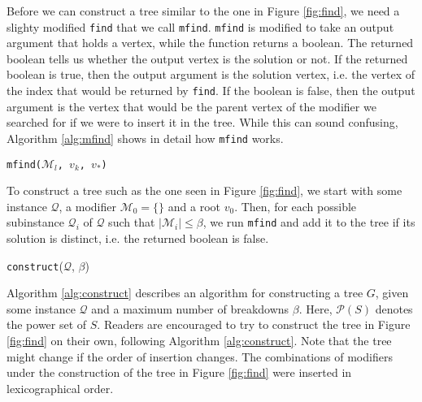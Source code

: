 Before we can construct a tree similar to the one in Figure \ref{fig:find},
we need a slighty modified \texttt{find} that we call \texttt{mfind}.
\texttt{mfind} is modified to take an output argument that holds a vertex,
while the function returns a boolean.
The returned boolean tells us whether the output vertex is the solution or not.
If the returned boolean is true, then the output argument is the solution
vertex, i.e. the vertex of the index that would be returned by \texttt{find}.
If the boolean is false, then the output argument is the vertex that would be
the parent vertex of the modifier we searched for if we were to insert it in
the tree.
While this can sound confusing, Algorithm \ref{alg:mfind} shows in detail how
\texttt{mfind} works.

\begin{algorithm}[ht!]
\caption{\texttt{mfind($\mathcal{M}_l$, $v_k$, $v_*$)}}
\label{alg:mfind}

\end{algorithm}
To construct a tree such as the one seen in Figure \ref{fig:find}, we start
with some instance $\mathcal{Q}$, a modifier $\mathcal{M}_0 = \{ {} \}$ and
a root $v_0$.
Then, for each possible subinstance $\mathcal{Q}_i$ of $\mathcal{Q}$ such that
$|\mathcal{M}_i| \leq \beta$, we run \texttt{mfind} and add it to the tree if
its solution is distinct, i.e. the returned boolean is false.

\begin{algorithm}[ht!]
\caption{\texttt{construct}($\mathcal{Q}$, $\beta$)}
\label{alg:construct}

\end{algorithm}
Algorithm \ref{alg:construct} describes an algorithm for constructing a tree
$G$, given some instance $\mathcal{Q}$ and a maximum number of breakdowns
$\beta$. Here, $\mathcal{P}(S)$ denotes the power set of $S$.
Readers are encouraged to try to construct the tree in Figure \ref{fig:find} on
their own, following Algorithm \ref{alg:construct}.
Note that the tree might change if the order of
insertion changes. The combinations of modifiers under the construction of the
tree in Figure \ref{fig:find} were inserted in lexicographical order.
